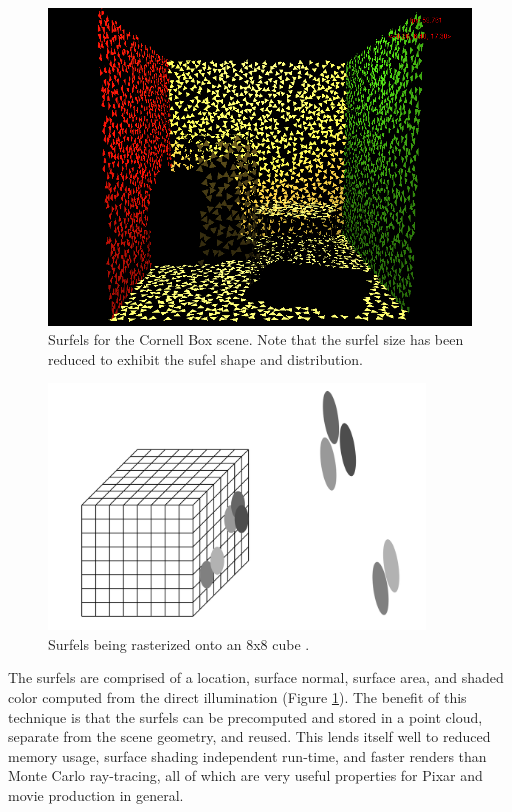 \begin{figure}[p]
   \centering
   \includegraphics[width=130mm]{../img/surfel_cloud_tris.png}
   \captionfonts
   \caption[Cornell Box surfels]{Surfels for the Cornell Box scene. Note that the surfel size has been reduced to exhibit the sufel shape and distribution.}
   \label{fig:surfels}
\end{figure}

\begin{figure}[p]
   \centering
   \includegraphics[width=100mm]{../img/surfel_raster.png}
   \captionfonts
   \caption[Rasterizing surfels]{Surfels being rasterized onto an 8x8 cube \cite{bib:christensen_slides}.}
   \label{fig:surfel_raster}
\end{figure}

The surfels are comprised of a location, surface normal, surface area, and shaded color computed from the direct illumination (Figure \ref{fig:surfels}). The benefit of this technique is that the surfels can be precomputed and stored in a point cloud, separate from the scene geometry, and reused. This lends itself well to reduced memory usage, surface shading independent run-time, and faster renders than Monte Carlo ray-tracing, all of which are very useful properties for Pixar and movie production in general.

